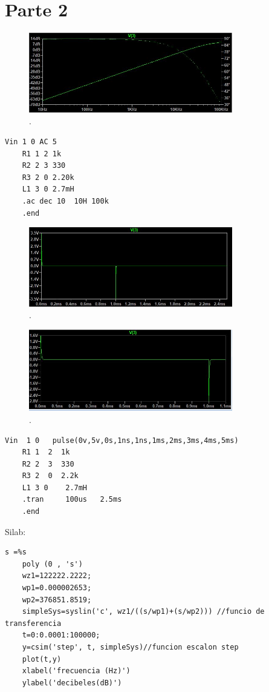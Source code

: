 \documentclass[12pt]{report}
\begin{document}
\section{Parte 2}
\begin{figure}[h!]
  \centering
    \includegraphics[width=3.5in]{ac}
  \caption{.}
\end{figure}
\begin{lstlisting}[frame=single]
    Vin 1 0 AC 5
    R1 1 2 1k
    R2 2 3 330
    R3 2 0 2.20k
    L1 3 0 2.7mH
    .ac dec 10  10H 100k
    .end

\end{lstlisting}
\begin{figure}[h!]
  \centering
    \includegraphics[width=3.5in]{pulse}
  \caption{.}
\end{figure}
\begin{figure}[h!]
  \centering
    \includegraphics[width=3.5in]{pulse2}
  \caption{.}
\end{figure}
\begin{lstlisting}[frame=single]
    Vin  1 0   pulse(0v,5v,0s,1ns,1ns,1ms,2ms,3ms,4ms,5ms) 
    R1 1  2  1k
    R2 2  3  330
    R3 2  0  2.2k
    L1 3 0    2.7mH
    .tran     100us   2.5ms
    .end
\end{lstlisting}
Silab:
\begin{lstlisting}[frame=single]
    s =%s
    poly (0 , 's')
    wz1=122222.2222;
    wp1=0.000002653;
    wp2=376851.8519;
    simpleSys=syslin('c', wz1/((s/wp1)+(s/wp2))) //funcio de        transferencia
    t=0:0.0001:100000;
    y=csim('step', t, simpleSys)//funcion escalon step
    plot(t,y)
    xlabel('frecuencia (Hz)')
    ylabel('decibeles(dB)')
\end{lstlisting}
\end{document}
